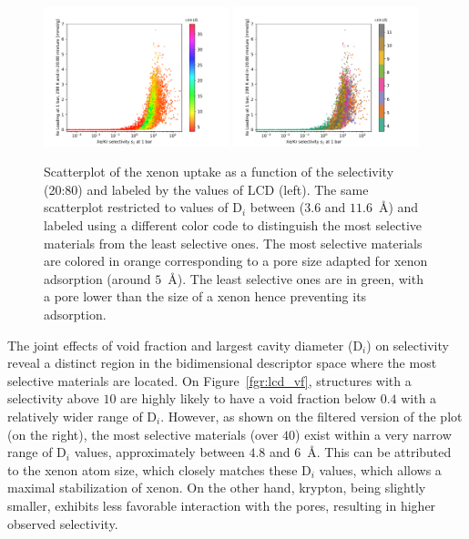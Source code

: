 \documentclass[main.tex]{subfiles}
\begin{document}
\begin{figure}[ht!]
  \centering
  \includegraphics[width=0.48\textwidth]{figures/2-thermo/Scatterplot_uptake_selectivity_lcd.pdf}
  \includegraphics[width=0.48\textwidth]{figures/2-thermo/Scatterplot_uptake_selectivity_lcd_zoom.pdf}
  \caption{Scatterplot of the xenon uptake as a function of the selectivity (20:80) and labeled by the values of LCD (left). The same scatterplot restricted to values of D$_i$ between ($3.6$ and $11.6$~\si{\angstrom}) and labeled using a different color code to distinguish the most selective materials from the least selective ones. The most selective materials are colored in orange corresponding to a pore size adapted for xenon adsorption (around $5$~\si{\angstrom}). The least selective ones are in green, with a pore lower than the size of a xenon hence preventing its adsorption.}\label{fgr:lcd}
\end{figure}

The joint effects of void fraction and largest cavity diameter (D$_i$) on selectivity reveal a distinct region in the bidimensional descriptor space where the most selective materials are located. On Figure~\ref{fgr:lcd_vf}, structures with a selectivity above $10$ are highly likely to have a void fraction below $0.4$ with a relatively wider range of D$_i$. However, as shown on the filtered version of the plot (on the right), the most selective materials (over $40$) exist within a very narrow range of D$_i$ values, approximately between $4.8$ and $6$~\si{\angstrom}. This can be attributed to the xenon atom size, which closely matches these D$_i$ values, which allows a maximal stabilization of xenon. On the other hand, krypton, being slightly smaller, exhibits less favorable interaction with the pores, resulting in higher observed selectivity. 
\end{document}
